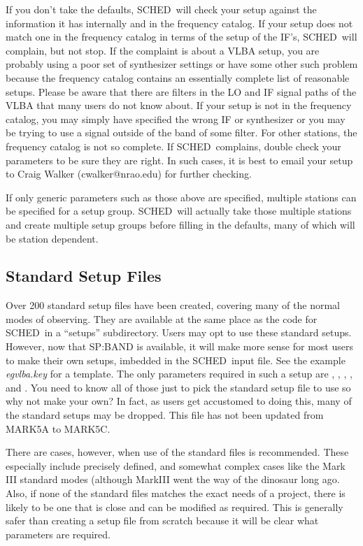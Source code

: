 \documentclass{report}
\newcommand{\schedb}{{\sc SCHED~}}
\begin{document}
If you don't take the defaults, \schedb will check your setup against
the information it has internally and in the frequency catalog.  If
your setup does not match one in the frequency catalog in terms of the
setup of the IF's, \schedb will complain, but not stop.  If the
complaint is about a VLBA setup, you are probably using a poor set of
synthesizer settings or have some other such problem because the
frequency catalog contains an essentially complete list of reasonable
setups.  Please be aware that there are filters in the LO and IF
signal paths of the VLBA that many users do not know about.  If your
setup is not in the frequency catalog, you may simply have specified
the wrong IF or synthesizer or you may be trying to use a signal
outside of the band of some filter.  For other stations, the frequency
catalog is not so complete.  If \schedb complains, double check your
parameters to be sure they are right.  In such cases, it is best to
email your setup to Craig Walker (cwalker@nrao.edu) for further
checking.

If only generic parameters such as those above are specified,
multiple stations can be specified for a setup group.  \schedb will
actually take those multiple stations and create multiple setup
groups before filling in the defaults, many of which will be
station dependent.

\subsection{\label{SSEC:SETSTD}Standard Setup Files}

Over 200 standard setup files have been created, covering many of the
normal modes of observing.  They are available at the same place as
the code for \schedb in a ``setups'' subdirectory.  Users may opt
to use these standard setups.  However, now that 
{SP:BAND} is available, it will make more sense for most users
to make their own setups, imbedded in the \schedb input file.  See
the example {\sl egvlba.key} for a template.  The only parameters
required in such a setup are ,
, ,
, and .
You need to know all of those just to pick the standard setup file
to use so why not make your own?  In fact, as users get accustomed
to doing this, many of the standard setups may be dropped.
This file has not been updated from MARK5A to MARK5C.

There are cases, however, when use of the standard files is
recommended.  These especially include precisely defined, and somewhat
complex cases like the Mark III standard modes (although MarkIII went
the way of the dinosaur long ago.  Also, if none of the standard files
matches the exact needs of a project, there is likely to be one that
is close and can be modified as required.  This is generally safer
than creating a setup file from scratch because it will be clear what
parameters are required.
\end{document}
